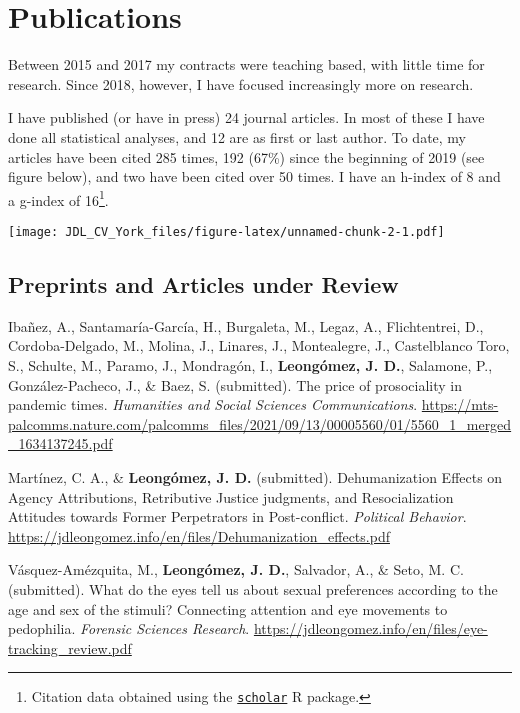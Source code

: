 \documentclass[11pt, a4paper]{awesome-cv}
\begin{document}
\hypertarget{publications}{%
\section{Publications}\label{publications}}

Between 2015 and 2017 my contracts were teaching based, with little time
for research. Since 2018, however, I have focused increasingly more on
research.

I have published (or have in press) 24 journal articles. In most of
these I have done all statistical analyses, and 12 are as first or last
author. To date, my articles have been cited 285 times, 192 (67\%) since
the beginning of 2019 (see figure below), and two have been cited over
50 times. I have an h-index of 8 and a g-index of 16\footnote{Citation
  data obtained using the
  \href{https://cran.r-project.org/web/packages/scholar/index.html}{\texttt{scholar}}
  R package.}.

\texttt{[image: JDL\_CV\_York\_files/figure-latex/unnamed-chunk-2-1.pdf]}

\hypertarget{section}{%
\subsection{\texorpdfstring{\textbf{Preprints and Articles under Review}}{}}\label{section}}

\begingroup
\setlength{\parindent}{-0.5in}
\setlength{\leftskip}{0.5in}

\hypertarget{refs_working_paper}{}
\leavevmode{}%
Ibañez, A., Santamaría-García, H., Burgaleta, M., Legaz, A.,
Flichtentrei, D., Cordoba-Delgado, M., Molina, J., Linares, J.,
Montealegre, J., Castelblanco Toro, S., Schulte, M., Paramo, J.,
Mondragón, I., \textbf{Leongómez, J. D.}, Salamone, P.,
González-Pacheco, J., \& Baez, S. (submitted). {The price of
prosociality in pandemic times}. \emph{Humanities and Social Sciences
Communications}.
\url{https://mts-palcomms.nature.com/palcomms_files/2021/09/13/00005560/01/5560_1_merged_1634137245.pdf}

\leavevmode{}%
Martínez, C. A., \& \textbf{Leongómez, J. D.} (submitted).
Dehumanization {Effects} on {Agency Attributions}, {Retributive Justice}
judgments, and {Resocialization Attitudes} towards {Former Perpetrators}
in {Post}-conflict. \emph{Political Behavior}.
\url{https://jdleongomez.info/en/files/Dehumanization_effects.pdf}

\leavevmode{}%
Vásquez-Amézquita, M., \textbf{Leongómez, J. D.}, Salvador, A., \& Seto,
M. C. (submitted). {What do the eyes tell us about sexual preferences
according to the age and sex of the stimuli? Connecting attention and
eye movements to pedophilia}. \emph{Forensic Sciences Research}.
\url{https://jdleongomez.info/en/files/eye-tracking_review.pdf}
\end{document}
